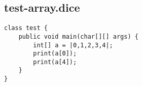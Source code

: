 \subsection{test-array.dice}
\begin{verbatim}
class test {
	public void main(char[][] args) {
		int[] a = |0,1,2,3,4|;
		print(a[0]);
		print(a[4]);
	}
}

\end{verbatim}